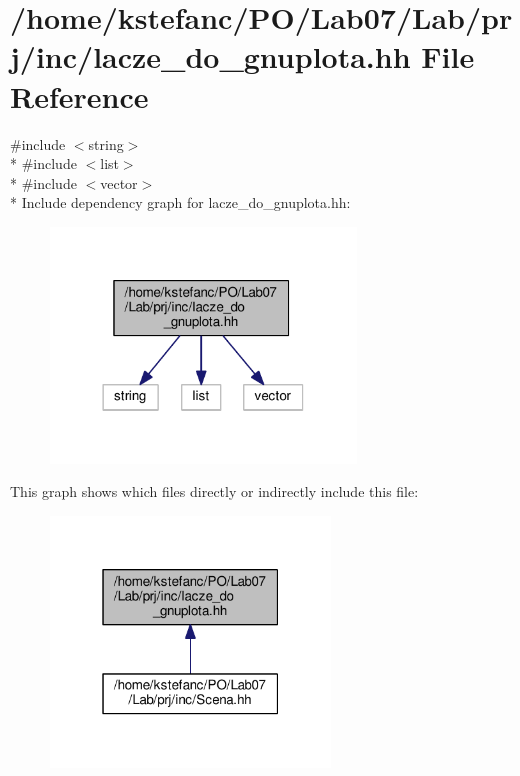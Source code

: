 \hypertarget{lacze__do__gnuplota_8hh}{\section{/home/kstefanc/\+P\+O/\+Lab07/\+Lab/prj/inc/lacze\+\_\+do\+\_\+gnuplota.hh File Reference}
\label{lacze__do__gnuplota_8hh}
}
{\ttfamily \#include $<$string$>$}\\*
{\ttfamily \#include $<$list$>$}\\*
{\ttfamily \#include $<$vector$>$}\\*
Include dependency graph for lacze\+\_\+do\+\_\+gnuplota.\+hh\+:\nopagebreak
\begin{figure}[H]
\begin{center}
\leavevmode
\includegraphics[width=230pt]{lacze__do__gnuplota_8hh__incl}
\end{center}
\end{figure}
This graph shows which files directly or indirectly include this file\+:\nopagebreak
\begin{figure}[H]
\begin{center}
\leavevmode
\includegraphics[width=211pt]{lacze__do__gnuplota_8hh__dep__incl}
\end{center}
\end{figure}
